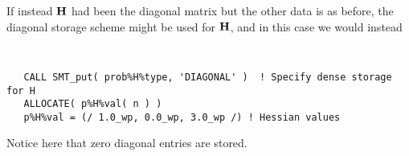 \documentclass{galahad}
\begin{document}
If instead ${\mathbf{H}}$ had been the diagonal matrix
but the other data is as before, the diagonal storage scheme 
might be used for ${\mathbf{H}}$, and in this case we would instead 
{\tt \small
\begin{verbatim}
   CALL SMT_put( prob%H%type, 'DIAGONAL' )  ! Specify dense storage for H
   ALLOCATE( p%H%val( n ) )
   p%H%val = (/ 1.0_wp, 0.0_wp, 3.0_wp /) ! Hessian values
\end{verbatim}
}
\noindent
Notice here that zero diagonal entries are stored.
\end{document}

